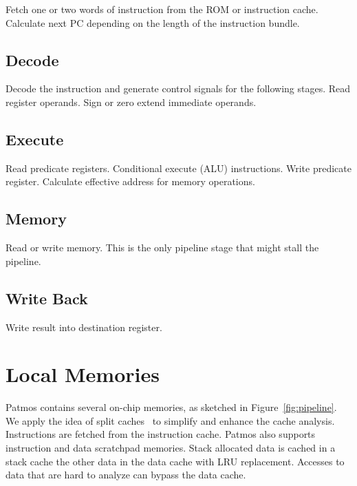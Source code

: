 \documentclass[a4paper,fontsize=10pt,twoside,DIV15,BCOR12mm,headinclude=true,footinclude=false,pagesize,bibtotoc]{scrbook}
\newcommand{\comment}[3]{

\textsf{\textbf{#1}} {\color{#3}#2}}
\newcommand{\stefan}[1]{\comment{Stefan}{#1}{RoyalPurple}}
\renewcommand{\stefan}[1]{}
\begin{document}
Fetch one or two words of instruction from the ROM or instruction cache.
Calculate next PC depending on the length of the instruction bundle.

\subsection{Decode}

Decode the instruction and generate control signals for the following stages.
Read register operands. Sign or zero extend immediate operands.

\subsection{Execute}

Read predicate registers. Conditional execute (ALU) instructions.
Write predicate register. Calculate effective address for memory operations.

\subsection{Memory}

Read or write memory. This is the only pipeline stage that might
stall the pipeline.

\subsection{Write Back}

Write result into destination register.

\stefan{Note that in the \texttt{pasim} simulator the Memory and Write Back stages are merged into a single MW stage at the time of writing,
and the stages are simulated from back to front.
While this has no effect on the timing and hazards of the instructions, there is only a single bypass from MW to EX (per pipeline). Apart
from that, all implementations of all instructions in the simulator should adhere to the above description of the stages.}

\section{Local Memories}

Patmos contains several on-chip memories, as sketched in Figure~\ref{fig:pipeline}.
We apply the idea of split caches~\cite{jop:dcache:rts} to simplify and enhance
the cache analysis. Instructions are fetched from the instruction cache.
Patmos also supports instruction and data scratchpad memories.
Stack allocated data is cached in a stack cache the other data in the
data cache with LRU replacement. Accesses to data that are hard to analyze can
bypass the data cache.
\end{document}
